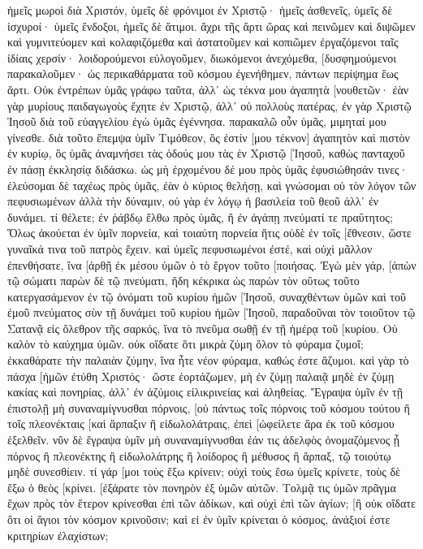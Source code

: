 ἡμεῖς μωροὶ διὰ Χριστόν, ὑμεῖς δὲ φρόνιμοι ἐν Χριστῷ· ἡμεῖς ἀσθενεῖς, ὑμεῖς δὲ ἰσχυροί· ὑμεῖς ἔνδοξοι, ἡμεῖς δὲ ἄτιμοι. 
ἄχρι τῆς ἄρτι ὥρας καὶ πεινῶμεν καὶ διψῶμεν καὶ γυμνιτεύομεν καὶ κολαφιζόμεθα καὶ ἀστατοῦμεν 
καὶ κοπιῶμεν ἐργαζόμενοι ταῖς ἰδίαις χερσίν· λοιδορούμενοι εὐλογοῦμεν, διωκόμενοι ἀνεχόμεθα, 
[δυσφημούμενοι παρακαλοῦμεν· ὡς περικαθάρματα τοῦ κόσμου ἐγενήθημεν, πάντων περίψημα ἕως ἄρτι. 
Οὐκ ἐντρέπων ὑμᾶς γράφω ταῦτα, ἀλλ᾽ ὡς τέκνα μου ἀγαπητὰ [νουθετῶν· 
ἐὰν γὰρ μυρίους παιδαγωγοὺς ἔχητε ἐν Χριστῷ, ἀλλ᾽ οὐ πολλοὺς πατέρας, ἐν γὰρ Χριστῷ Ἰησοῦ διὰ τοῦ εὐαγγελίου ἐγὼ ὑμᾶς ἐγέννησα. 
παρακαλῶ οὖν ὑμᾶς, μιμηταί μου γίνεσθε. 
διὰ τοῦτο ἔπεμψα ὑμῖν Τιμόθεον, ὅς ἐστίν [μου τέκνον] ἀγαπητὸν καὶ πιστὸν ἐν κυρίῳ, ὃς ὑμᾶς ἀναμνήσει τὰς ὁδούς μου τὰς ἐν Χριστῷ [Ἰησοῦ, καθὼς πανταχοῦ ἐν πάσῃ ἐκκλησίᾳ διδάσκω. 
ὡς μὴ ἐρχομένου δέ μου πρὸς ὑμᾶς ἐφυσιώθησάν τινες· 
ἐλεύσομαι δὲ ταχέως πρὸς ὑμᾶς, ἐὰν ὁ κύριος θελήσῃ, καὶ γνώσομαι οὐ τὸν λόγον τῶν πεφυσιωμένων ἀλλὰ τὴν δύναμιν, 
οὐ γὰρ ἐν λόγῳ ἡ βασιλεία τοῦ θεοῦ ἀλλ᾽ ἐν δυνάμει. 
τί θέλετε; ἐν ῥάβδῳ ἔλθω πρὸς ὑμᾶς, ἢ ἐν ἀγάπῃ πνεύματί τε πραΰτητος; 
Ὅλως ἀκούεται ἐν ὑμῖν πορνεία, καὶ τοιαύτη πορνεία ἥτις οὐδὲ ἐν τοῖς [ἔθνεσιν, ὥστε γυναῖκά τινα τοῦ πατρὸς ἔχειν. 
καὶ ὑμεῖς πεφυσιωμένοι ἐστέ, καὶ οὐχὶ μᾶλλον ἐπενθήσατε, ἵνα [ἀρθῇ ἐκ μέσου ὑμῶν ὁ τὸ ἔργον τοῦτο [ποιήσας. 
Ἐγὼ μὲν γάρ, [ἀπὼν τῷ σώματι παρὼν δὲ τῷ πνεύματι, ἤδη κέκρικα ὡς παρὼν τὸν οὕτως τοῦτο κατεργασάμενον 
ἐν τῷ ὀνόματι τοῦ κυρίου ἡμῶν [Ἰησοῦ, συναχθέντων ὑμῶν καὶ τοῦ ἐμοῦ πνεύματος σὺν τῇ δυνάμει τοῦ κυρίου ἡμῶν [Ἰησοῦ, 
παραδοῦναι τὸν τοιοῦτον τῷ Σατανᾷ εἰς ὄλεθρον τῆς σαρκός, ἵνα τὸ πνεῦμα σωθῇ ἐν τῇ ἡμέρᾳ τοῦ [κυρίου. 
Οὐ καλὸν τὸ καύχημα ὑμῶν. οὐκ οἴδατε ὅτι μικρὰ ζύμη ὅλον τὸ φύραμα ζυμοῖ; 
ἐκκαθάρατε τὴν παλαιὰν ζύμην, ἵνα ἦτε νέον φύραμα, καθώς ἐστε ἄζυμοι. καὶ γὰρ τὸ πάσχα [ἡμῶν ἐτύθη Χριστός· 
ὥστε ἑορτάζωμεν, μὴ ἐν ζύμῃ παλαιᾷ μηδὲ ἐν ζύμῃ κακίας καὶ πονηρίας, ἀλλ᾽ ἐν ἀζύμοις εἰλικρινείας καὶ ἀληθείας. 
Ἔγραψα ὑμῖν ἐν τῇ ἐπιστολῇ μὴ συναναμίγνυσθαι πόρνοις, 
[οὐ πάντως τοῖς πόρνοις τοῦ κόσμου τούτου ἢ τοῖς πλεονέκταις [καὶ ἅρπαξιν ἢ εἰδωλολάτραις, ἐπεὶ [ὠφείλετε ἄρα ἐκ τοῦ κόσμου ἐξελθεῖν. 
νῦν δὲ ἔγραψα ὑμῖν μὴ συναναμίγνυσθαι ἐάν τις ἀδελφὸς ὀνομαζόμενος ᾖ πόρνος ἢ πλεονέκτης ἢ εἰδωλολάτρης ἢ λοίδορος ἢ μέθυσος ἢ ἅρπαξ, τῷ τοιούτῳ μηδὲ συνεσθίειν. 
τί γάρ [μοι τοὺς ἔξω κρίνειν; οὐχὶ τοὺς ἔσω ὑμεῖς κρίνετε, 
τοὺς δὲ ἔξω ὁ θεὸς [κρίνει. [ἐξάρατε τὸν πονηρὸν ἐξ ὑμῶν αὐτῶν. 
Τολμᾷ τις ὑμῶν πρᾶγμα ἔχων πρὸς τὸν ἕτερον κρίνεσθαι ἐπὶ τῶν ἀδίκων, καὶ οὐχὶ ἐπὶ τῶν ἁγίων; 
[ἢ οὐκ οἴδατε ὅτι οἱ ἅγιοι τὸν κόσμον κρινοῦσιν; καὶ εἰ ἐν ὑμῖν κρίνεται ὁ κόσμος, ἀνάξιοί ἐστε κριτηρίων ἐλαχίστων; 
